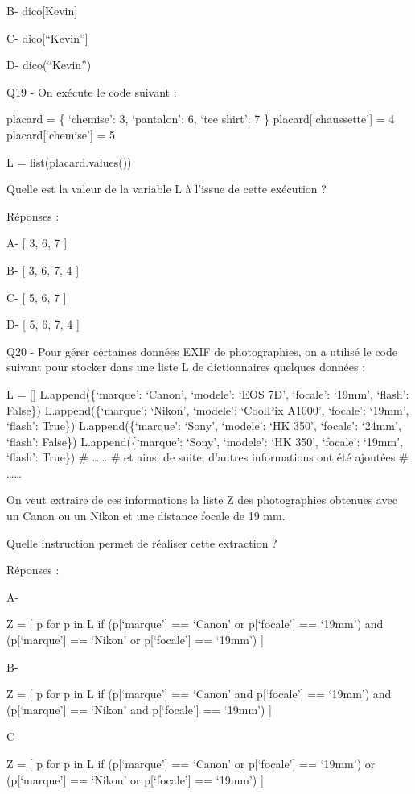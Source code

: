 \documentclass[
]{book}
\begin{document}
B- dico{[}Kevin{]}

C- dico{[}``Kevin''{]}

D- dico(``Kevin'')

Q19 - On exécute le code suivant :

placard = \{ `chemise': 3, `pantalon': 6, `tee shirt': 7 \}
placard{[}`chaussette'{]} = 4
placard{[}`chemise'{]} = 5

L = list(placard.values())

Quelle est la valeur de la variable L à l'issue de cette exécution ?

Réponses :

A- {[} 3, 6, 7 {]}

B- {[} 3, 6, 7, 4 {]}

C- {[} 5, 6, 7 {]}

D- {[} 5, 6, 7, 4 {]}

Q20 - Pour gérer certaines données EXIF de photographies, on a utilisé le code suivant pour stocker dans une liste L de dictionnaires quelques données :

L = {[}{]}
L.append(\{`marque': `Canon', `modele': `EOS 7D', `focale': `19mm', `flash': False\})
L.append(\{`marque': `Nikon', `modele': `CoolPix A1000', `focale': `19mm', `flash': True\})
L.append(\{`marque': `Sony', `modele': `HK 350', `focale': `24mm', `flash': False\})
L.append(\{`marque': `Sony', `modele': `HK 350', `focale': `19mm', `flash': True\})
\# \ldots\ldots{}
\# et ainsi de suite, d'autres informations ont été ajoutées
\# \ldots\ldots{}

On veut extraire de ces informations la liste Z des photographies obtenues avec un Canon ou un Nikon et une distance focale de 19 mm.

Quelle instruction permet de réaliser cette extraction ?

Réponses :

A-

Z = {[} p for p in L if (p{[}`marque'{]} == `Canon' or p{[}`focale'{]} == `19mm') and (p{[}`marque'{]} == `Nikon' or p{[}`focale'{]} == `19mm') {]}

B-

Z = {[} p for p in L if (p{[}`marque'{]} == `Canon' and p{[}`focale'{]} == `19mm') and (p{[}`marque'{]} == `Nikon' and p{[}`focale'{]} == `19mm') {]}

C-

Z = {[} p for p in L if (p{[}`marque'{]} == `Canon' or p{[}`focale'{]} == `19mm') or (p{[}`marque'{]} == `Nikon' or p{[}`focale'{]} == `19mm') {]}
\end{document}
